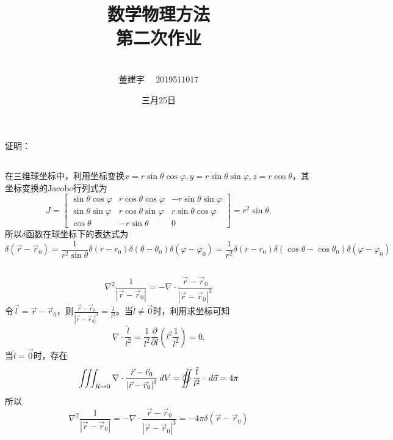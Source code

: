 \documentclass[10.5pt]{article}
\title{数学物理方法
\\第二次作业}
\author{\\董建宇   ~~2019511017}
\date{三月25日}
\begin{document}
    
\maketitle
\newpage

\section{}
证明：
\subsection{}
在三维球坐标中，利用坐标变换$x=r\sin\theta\cos\varphi,y=r\sin\theta\sin\varphi,z=r\cos\theta$，其坐标变换的Jacobe行列式为$$J=\begin{bmatrix}
    \sin\theta\cos\varphi & r\cos\theta\cos\varphi & -r\sin\theta\sin\varphi\\
    \sin\theta\sin\varphi & r\cos\theta\sin\varphi & r\sin\theta\cos\varphi\\
    \cos\theta & -r\sin\theta & 0
\end{bmatrix} = r^2\sin\theta.$$\indent
所以$\delta$函数在球坐标下的表达式为$$\delta\left(\vec{r} - \vec{r}_0\right) = \frac{1}{r^2\sin\theta}\delta(r-r_0)\delta(\theta-\theta_0)\delta(\varphi-\varphi_0) = \frac{1}{r^2}\delta(r-r_0)\delta(\cos\theta-\cos\theta_0)\delta(\varphi-\varphi_0)$$
\subsection{}
$$\nabla^2\frac{1}{\left\lvert \vec{r}-\vec{r}_0 \right\rvert} = -\nabla\cdot \frac{\vec{r}-\vec{r}_0}{\left\lvert \vec{r}-\vec{r}_0 \right\rvert ^3}$$\indent
令$\vec{l} = \vec{r}-\vec{r}_0$，则$\frac{\vec{r}-\vec{r}_0}{\left\lvert \vec{r}-\vec{r}_0 \right\rvert ^3} = \frac{\hat{l}}{l^2}$。当$\hat{l}\neq \vec{0}$时，利用求坐标可知$$\nabla\cdot\frac{\hat{l}}{l^2} = \frac{1}{l^2} \frac{\partial }{\partial l}\left(l^2 \frac{1}{l^2}\right) = 0.$$\indent
\def\ooint{{\bigcirc}\kern-11.5pt{\int}\kern-6.5pt{\int}}
当$\hat{l}=\vec{0}$时，存在$$\iiint_{R\to 0} \nabla\cdot \frac{\vec{r}-\vec{r}_0}{\left\lvert \vec{r}-\vec{r}_0 \right\rvert ^3} \,dV = \ooint \frac{\hat{l}}{l^2}\cdot\,d\vec{a} =4\pi$$\indent
所以$$\nabla^2\frac{1}{\left\lvert \vec{r}-\vec{r}_0 \right\rvert} = -\nabla\cdot \frac{\vec{r}-\vec{r}_0}{\left\lvert \vec{r}-\vec{r}_0 \right\rvert ^3} = -4\pi\delta(\vec{r}-\vec{r}_0)$$

\section{}
\end{document}
